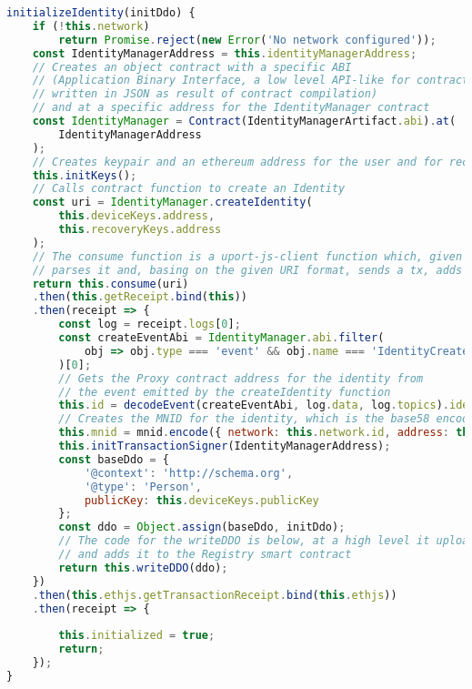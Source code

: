 \begin{lstlisting}[language=JavaScript, numbers=none]
initializeIdentity(initDdo) {
    if (!this.network)
        return Promise.reject(new Error('No network configured'));
    const IdentityManagerAddress = this.identityManagerAddress;
    // Creates an object contract with a specific ABI 
    // (Application Binary Interface, a low level API-like for contracts, 
    // written in JSON as result of contract compilation)
    // and at a specific address for the IdentityManager contract
    const IdentityManager = Contract(IdentityManagerArtifact.abi).at(
        IdentityManagerAddress
    );
    // Creates keypair and an ethereum address for the user and for recovery
    this.initKeys();
    // Calls contract function to create an Identity
    const uri = IdentityManager.createIdentity(
        this.deviceKeys.address,
        this.recoveryKeys.address
    );
    // The consume function is a uport-js-client function which, given a URI which conforms to the uPort Protocol specs,
    // parses it and, basing on the given URI format, sends a tx, adds an attestation or requests credentials.
    return this.consume(uri)
    .then(this.getReceipt.bind(this))
    .then(receipt => {
        const log = receipt.logs[0];
        const createEventAbi = IdentityManager.abi.filter(
            obj => obj.type === 'event' && obj.name === 'IdentityCreated'
        )[0];
        // Gets the Proxy contract address for the identity from
        // the event emitted by the createIdentity function
        this.id = decodeEvent(createEventAbi, log.data, log.topics).identity;
        // Creates the MNID for the identity, which is the base58 encoding of the network id and the identity Proxy address
        this.mnid = mnid.encode({ network: this.network.id, address: this.id });
        this.initTransactionSigner(IdentityManagerAddress);
        const baseDdo = {
            '@context': 'http://schema.org',
            '@type': 'Person',
            publicKey: this.deviceKeys.publicKey
        };
        const ddo = Object.assign(baseDdo, initDdo);
        // The code for the writeDDO is below, at a high level it uploads the ddo object to IPFS
        // and adds it to the Registry smart contract
        return this.writeDDO(ddo);
    })
    .then(this.ethjs.getTransactionReceipt.bind(this.ethjs))
    .then(receipt => {
        
        this.initialized = true;
        return;
    });
}


\end{lstlisting}
